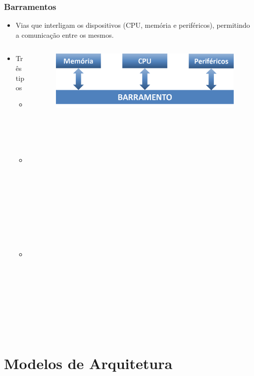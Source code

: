 \documentclass[aspectratio=169,
				xcolor=table]{beamer}
\begin{document}
	\begin{frame}
		\frametitle{Barramentos}
		\begin{itemize}
			\item Vias que interligam os dispositivos (CPU, memória e periféricos), permitindo a comunicação entre os mesmos.
			\vspace{1em}
		\end{itemize}
		
		\begin{columns}[t]
			\begin{column}{0.35\textwidth}
				\begin{itemize}
				
					\item Três tipos
					\begin{itemize}
						\item Dados
						\item Endereços
						\item Controle				
					\end{itemize}
				\end{itemize}
			\end{column}
			\begin{column}{0.65\textwidth}
				\begin{figure}
					\centering
					\includegraphics[width=.9\textwidth, keepaspectratio]{../figs/cap04/barramento} 					
				\end{figure}			
			\end{column}
		\end{columns}
		

	\end{frame}
	
	\section{Modelos de Arquitetura}
	
\end{document}
